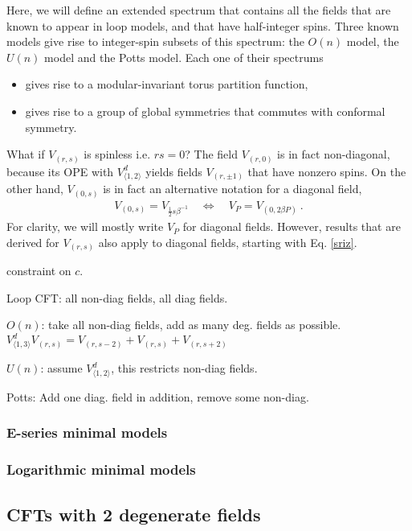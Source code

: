 \documentclass[12pt, a4paper]{article}
\theoremstyle{break}
\begin{document}
Here, we will define an extended spectrum that contains all the fields that are known to appear in loop models, and that have half-integer spins. Three known models give rise to integer-spin subsets of this spectrum: the $O(n)$ model, the $U(n)$ model and the Potts model. Each one of their spectrums
\begin{itemize}
 \item gives rise to a modular-invariant torus partition function,
 \item gives rise to a group of global symmetries that commutes with conformal symmetry. 
\end{itemize}


What if $V_{(r,s)}$ is spinless i.e. $rs=0$? The field $V_{(r,0)}$ is in fact non-diagonal, because its OPE with $V^d_{\langle 1,2\rangle}$ yields fields $V_{(r,\pm 1)}$ that have nonzero spins. On the other hand, $V_{(0,s)}$ is in fact an alternative notation for a diagonal field,
\begin{align}
 V_{(0,s)} = V_{\frac12 s\beta^{-1}}  \quad \iff \quad V_P = V_{(0, 2\beta P)}\ . 
 \label{vosvp}
\end{align}
For clarity, we will mostly write $V_P$ for diagonal fields. However, results that are derived for $V_{(r,s)}$ also apply to diagonal fields, starting with Eq. \eqref{sriz}.

constraint on $c$.


Loop CFT: all non-diag fields, all diag fields. 

$O(n)$: take all non-diag fields, add as many deg. fields as possible. $V^d_{\langle 1,3\rangle}V_{(r,s)}=V_{(r,s-2)}+V_{(r,s)}+V_{(r,s+2)}$

$U(n)$:  assume $V^d_{\langle 1,2\rangle}$, this restricts non-diag fields.

Potts: Add one diag. field in addition, remove some non-diag. 



\subsubsection{E-series minimal models}

\subsubsection{Logarithmic minimal models}

\subsection{CFTs with 2 degenerate fields}
\end{document}
